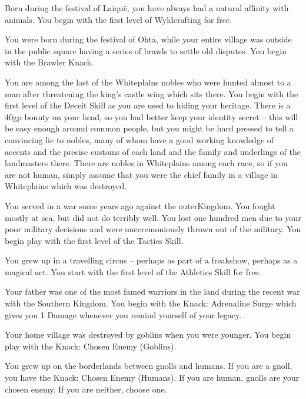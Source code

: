 \begin{multicols}{2}
\begin{list}{\addtocounter{list}{1}\textbf{:}}{\raggedleft}
  \item
  Born during the festival of Laiqu\"{e}, you have always had a natural affinity with animals.
  You begin with the first level of Wyldcrafting for free.

  \item
  You were born during the festival of Ohta, while your entire village was outside in the public square having a series of brawls to settle old disputes.
  You begin with the Brawler Knack.

  \item
  You are among the last of the Whiteplains nobles who were hunted almost to a man after threatening the king's castle wing which sits there.
  You begin with the first level of the Deceit Skill as you are used to hiding your heritage.
  There is a 40gp bounty on your head, so you had better keep your identity secret -- this will be easy enough around common people, but you might be hard pressed to tell a convincing lie to nobles, many of whom have a good working knowledge of accents and the precise customs of each land and the family and underlings of the landmasters there.
  There are nobles in Whiteplains among each race, so if you are not human, simply assume that you were the chief family in a village in Whiteplains which was destroyed.

  \item
  You served in a war some years ago against the \gls{outerKingdom}.
  You fought mostly at sea, but did not do terribly well.
  You lost one hundred men due to your poor military decisions and were unceremoniously thrown out of the military.
  You begin play with the first level of the Tactics Skill.

  \item
  You grew up in a travelling circus -- perhaps as part of a freakshow, perhaps as a magical act.
  You start with the first level of the Athletics Skill for free.

  \item
  Your father was one of the most famed warriors in the land during the recent war with the Southern Kingdom.
  You begin with the Knack: Adrenaline Surge which gives you 1 Damage whenever you remind yourself of your legacy.

  \item
  Your home village was destroyed by goblins when you were younger.
  You begin play with the Knack: Chosen Enemy (Goblins).

  \item
  You grew up on the borderlands between gnolls and humans.
  If you are a gnoll, you have the Knack: Chosen Enemy (Humans).
  If you are human, gnolls are your chosen enemy.
  If you are neither, choose one.


\end{list}
\end{multicols}
